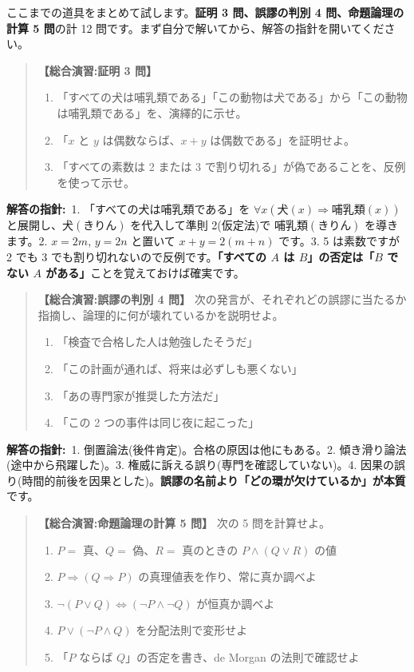 \documentclass{article}
\begin{document}
ここまでの道具をまとめて試します。\textbf{証明 3 問、誤謬の判別 4 問、命題論理の計算 5 問}の計 12 問です。まず自分で解いてから、解答の指針を開いてください。

\begin{quote}
\textbf{【総合演習:証明 3 問】}
\begin{enumerate}
\item 「すべての犬は哺乳類である」「この動物は犬である」から「この動物は哺乳類である」を、演繹的に示せ。
\item 「\(x\) と \(y\) は偶数ならば、\(x + y\) は偶数である」を証明せよ。
\item 「すべての素数は 2 または 3 で割り切れる」が偽であることを、反例を使って示せ。
\end{enumerate}
\end{quote}

\textbf{解答の指針:}\ 1. 「すべての犬は哺乳類である」を \(\forall x(\mathrm{犬}(x) \Rightarrow \mathrm{哺乳類}(x))\) と展開し、\(\mathrm{犬}(\mathrm{きりん})\) を代入して準則 2(仮定法)で \(\mathrm{哺乳類}(\mathrm{きりん})\) を導きます。2. \(x = 2m\), \(y = 2n\) と置いて \(x + y = 2(m+n)\) です。3. 5 は素数ですが 2 でも 3 でも割り切れないので反例です。\textbf{「すべての \(A\) は \(B\)」の否定は「\(B\) でない \(A\) がある」}ことを覚えておけば確実です。

\begin{quote}
\textbf{【総合演習:誤謬の判別 4 問】} 次の発言が、それぞれどの誤謬に当たるか指摘し、論理的に何が壊れているかを説明せよ。
\begin{enumerate}
\item 「検査で合格した人は勉強したそうだ」
\item 「この計画が通れば、将来は必ずしも悪くない」
\item 「あの専門家が推奨した方法だ」
\item 「この 2 つの事件は同じ夜に起こった」
\end{enumerate}
\end{quote}

\textbf{解答の指針:}\ 1. 倒置論法(後件肯定)。合格の原因は他にもある。2. 傾き滑り論法(途中から飛躍した)。3. 権威に訴える誤り(専門を確認していない)。4. 因果の誤り(時間的前後を因果とした)。\textbf{誤謬の名前より「どの環が欠けているか」が本質}です。

\begin{quote}
\textbf{【総合演習:命題論理の計算 5 問】} 次の 5 問を計算せよ。
\begin{enumerate}
\item \(P =\) 真、\(Q =\) 偽、\(R =\) 真のときの \(P \land (Q \lor R)\) の値
\item \(P \Rightarrow (Q \Rightarrow P)\) の真理値表を作り、常に真か調べよ
\item \(\neg(P \lor Q) \Leftrightarrow (\neg P \land \neg Q)\) が恒真か調べよ
\item \(P \lor (\neg P \land Q)\) を分配法則で変形せよ
\item 「\(P\) ならば \(Q\)」の否定を書き、de Morgan の法則で確認せよ
\end{enumerate}
\end{quote}
\end{document}
